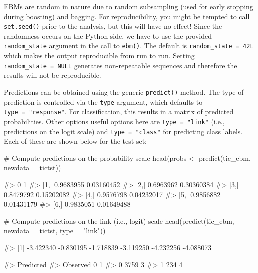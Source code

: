 EBMs are random in nature due to random subsampling (used for early
stopping during boosting) and bagging. For reproducibility, you might be
tempted to call \texttt{set.seed()} prior to the analysis, but this will
have no effect! Since the randomness occurs on the Python side, we have
to use the provided \texttt{random\_state} argument in the call to
\texttt{ebm()}. The default is \texttt{random\_state\ =\ 42L} which
makes the output reproducible from run to run. Setting
\texttt{random\_state\ =\ NULL} generates non-repeatable sequences and
therefore the results will not be reproducible.

Predictions can be obtained using the generic \texttt{predict()} method.
The type of prediction is controlled via the \texttt{type} argument,
which defaults to \texttt{type\ =\ "response"}. For classification, this
results in a matrix of predicted probabilities. Other options useful
options here are \texttt{type\ =\ "link"} (i.e., predictions on the
logit scale) and \texttt{type\ =\ "class"} for predicting class labels.
Each of these are shown below for the test set:

\begin{Schunk}
\begin{Sinput}
# Compute predictions on the probability scale
head(probs <- predict(tic_ebm, newdata = tictst))
\end{Sinput}
\begin{Soutput}
#>              0          1
#> [1,] 0.9683955 0.03160452
#> [2,] 0.6963962 0.30360384
#> [3,] 0.8479792 0.15202082
#> [4,] 0.9576798 0.04232017
#> [5,] 0.9856882 0.01431179
#> [6,] 0.9835051 0.01649488
\end{Soutput}
\begin{Sinput}
# Compute predictions on the link (i.e., logit) scale
head(predict(tic_ebm, newdata = tictst, type = "link"))
\end{Sinput}
\begin{Soutput}
#> [1] -3.422340 -0.830195 -1.718839 -3.119250 -4.232256 -4.088073
\end{Soutput}
\begin{Soutput}
#>         Predicted
#> Observed    0    1
#>        0 3759    3
#>        1  234    4
\end{Soutput}
\end{Schunk}


